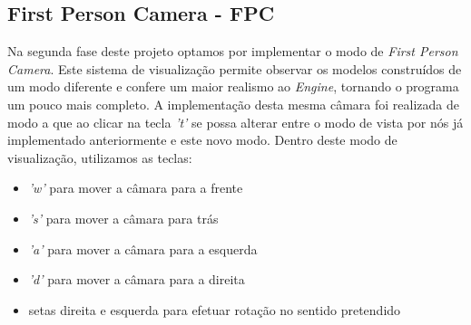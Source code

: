 \documentclass{article}
\begin{document}
\subsection{First Person Camera - FPC}
Na segunda fase deste projeto optamos por implementar o modo de \textit{First Person Camera}. Este sistema de visualização permite observar os modelos construídos de um modo diferente e confere um maior realismo ao \textit{Engine}, tornando o programa um pouco mais completo. A implementação desta mesma câmara foi realizada de modo a que ao clicar na tecla \textit{'t'} se possa alterar entre o modo de vista por nós já implementado anteriormente e este novo modo.
\newline
Dentro deste modo de visualização, utilizamos as teclas:
\begin{itemize}
    \item \textit{'w'} para mover a câmara para a frente
    \item \textit{'s'} para mover a câmara para trás
    \item \textit{'a'} para mover a câmara para a esquerda
    \item \textit{'d'} para mover a câmara para a direita
    \item setas direita e esquerda para efetuar rotação no sentido pretendido
\end{itemize}
\end{document}

